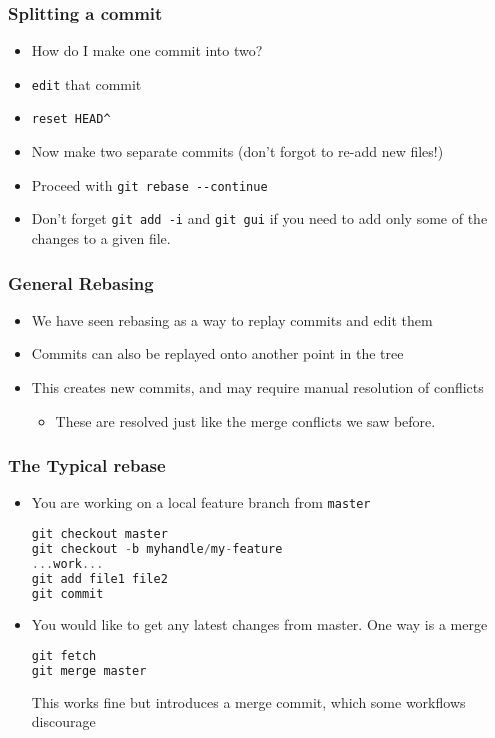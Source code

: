 \begin{frame}[fragile]
\frametitle{Splitting a commit}
\begin{itemize}
\item How do I make one commit into two?
\item \texttt{edit} that commit
\item \lstinline{reset HEAD^}
\item Now make two separate commits (don't forgot to re-add new files!)
\item Proceed with \lstinline{git rebase --continue}
\item Don't forget \lstinline{git add -i} and \lstinline{git gui} if you need to add only some of the changes to a given file.
\end{itemize}
\end{frame}

\begin{frame}[fragile]
\frametitle{General Rebasing}
\begin{itemize}
\item We have seen rebasing as a way to replay commits and edit them
\item Commits can also be replayed onto another point in the tree
\item This creates new commits, and may require manual resolution of conflicts
\begin{itemize}
\item These are resolved just like the merge conflicts we saw before.
\end{itemize}
\end{itemize}
\end{frame}

\begin{frame}[fragile]
\frametitle{The Typical rebase}
\begin{itemize}
\item You are working on a local feature branch from \texttt{master}
\begin{lstlisting}[language=C++]
git checkout master
git checkout -b myhandle/my-feature
...work...
git add file1 file2
git commit
\end{lstlisting}
\item You would like to get any latest changes from master. One way is a merge
\begin{lstlisting}[language=C++]
git fetch
git merge master
\end{lstlisting}
This works fine but introduces a merge commit, which some workflows discourage
\end{itemize}
\end{frame}

